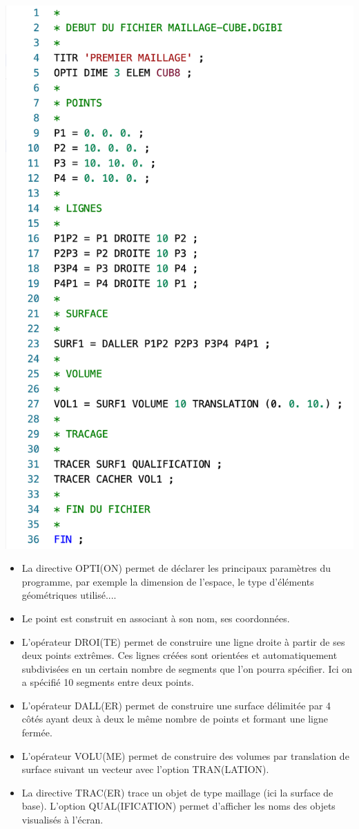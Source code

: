 \documentclass[a4paper,multicol]{article}
\begin{document}
\begin{multicols}{2}
\includegraphics[scale=0.25]{pgm01Cube.png} 
\footnotesize
\begin{itemize}
\item La directive OPTI(ON) permet de déclarer les principaux paramètres du programme, par
exemple la dimension de l'espace, le type d'éléments géométriques utilisé....  
\item Le point est construit en associant à son nom, ses coordonnées.
\item L'opérateur DROI(TE) permet de construire une ligne droite à partir de ses deux points extrêmes. Ces lignes créées sont orientées et automatiquement subdivisées en un certain nombre de segments que
l'on pourra spécifier. Ici on a spécifié 10 segments entre deux points. 
\item L'opérateur DALL(ER) permet de construire une surface délimitée par 4 côtés ayant deux à deux le même nombre de points et formant une ligne fermée. 
\item L'opérateur VOLU(ME) permet de construire des volumes par translation de surface suivant un vecteur avec l'option TRAN(LATION).
\item La directive TRAC(ER) trace un objet de type maillage (ici la surface de base). L'option QUAL(IFICATION) permet d'afficher les noms des objets visualisés à l'écran.
\end{itemize}



\end{multicols}
\end{document}
